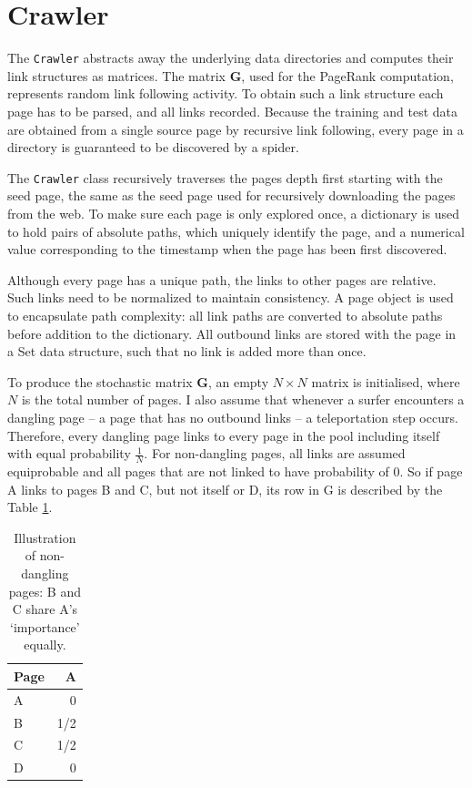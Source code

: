 \documentclass[12pt,a4paper,notitlepage,twoside]{scrbook}
\begin{document}
\section{Crawler} 

The \texttt{Crawler} abstracts away the underlying data directories and
computes their link structures as matrices.  The matrix \(\bm{G}\), used for the
PageRank computation, represents random link following activity.  To obtain
such a link structure each page has to be parsed, and all links recorded.
Because the training and test data are obtained from a single source page by recursive link
following, every page in a directory is guaranteed to be discovered by a
spider.

The \texttt{Crawler} class recursively traverses the pages depth first starting with the
seed page, the same as the seed page used for recursively downloading the pages
from the web. To make sure each page is only explored once, a dictionary is
used to hold pairs of absolute paths, which uniquely identify the page, and a
numerical value corresponding to the timestamp when the page has been first
discovered.

Although every page has a unique path, the links to other pages are relative.
Such links need to be normalized to maintain consistency.  A page object is
used to encapsulate path complexity: all link paths are converted to absolute
paths before addition to the dictionary.  All outbound links are stored with
the page in a Set data structure, such that no link is added more than once. 

To produce the stochastic matrix \(\bm{G}\), an empty \(N\times N\) matrix is initialised, where \(N\)
is the total number of pages. I also assume that whenever a surfer encounters a
dangling page -- a page that has no outbound links -- a teleportation step
occurs. Therefore, every dangling page links to every page in the pool
including itself with equal probability \(\frac{1}{N}\). For non-dangling pages, all links
are assumed equiprobable and all pages that are not linked to have probability
of 0. So if page A links to pages B and C, but not itself or D, its row in G is
described by the Table \ref{tab}.

\begin{table}
    \begin{center}
      \begin{tabular}{|l|r|}
        \hline
        Page & A \\ \hline
         A &  0  \\ \hline
         B & 1/2 \\ \hline
         C & 1/2 \\ \hline
         D & 0   \\ \hline
      \end{tabular}
      \caption{Illustration of non-dangling pages: B and C share A's `importance' equally.\label{tab}}
  \end{center}
\end{table}
\end{document}

